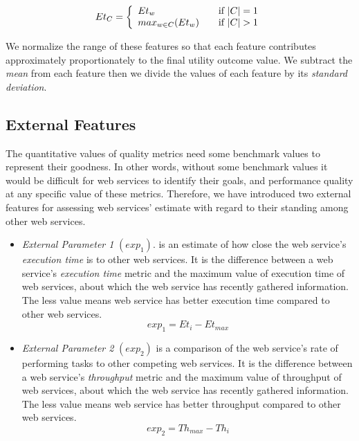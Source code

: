 \documentclass[10pt,journal,cspaper,compsoc]{IEEEtran}
\begin{document}
\begin{itemize}
	\begin{equation}
		Et_{C} = \left\{ 
			\begin{array}{l l}
				Et_{w} & \quad \text{if $|C| = 1$}\\
				max_{w \in C}{(Et_{w})} & \quad \text{if $|C| > 1$}
			\end{array} \right.
	\end{equation}
	
\end{itemize}

	We normalize the range of these features so that each feature contributes approximately proportionately to the final utility outcome value. We subtract the \emph{mean} from each feature then we divide the values of each feature by its \emph{standard deviation}.


\subsection{External Features}\label{s:ef}

The quantitative values of quality metrics need some benchmark values to represent their goodness. In other words, without some benchmark values it would be difficult for web services to identify their goals, and performance quality at any specific value of these metrics. Therefore, we have introduced two external features for assessing web services' estimate with regard to their standing among other web services.

\begin{itemize}
  \item \emph{External Parameter 1} $(exp_1)$. is an estimate of how close the web service's \emph{execution time} is to other web services. It is the difference between a web service's \emph{execution time} metric and the maximum value of execution time of web services, about which the web service has recently gathered information. The less value means web service has better execution time compared to other web services.
	\begin{equation}\label{exp_1:f}
		exp_1 = Et_{i} - Et_{max}
	\end{equation}
	\item \emph{External Parameter 2} $(exp_2)$ is a comparison of the web service's rate of performing tasks to other competing web services. It is the difference between a web service's \emph{throughput} metric and the maximum value of throughput of web services, about which the web service has recently gathered information. The less value means web service has better throughput compared to other web services.
	\begin{equation}\label{exp_2Lf}
		exp_2 = Th_{max} - Th_{i}
	\end{equation}
\end{itemize}
\end{document}
